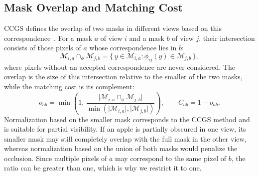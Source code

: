 \documentclass[english, egger, bsc]{vcethesis}
\begin{document}
\subsection{Mask Overlap and Matching Cost}
\label{sec:method_overlap}

CCGS defines the overlap of two masks in different views based on this correspondence~\cite{hu2026ccgs}. For a mask $a$ of view $i$ and a mask $b$ of view $j$, their intersection consists of those pixels of $a$ whose correspondence lies in $b$:
\begin{equation}
    \label{eq:intersection}
    \mathcal{M}_{i,a} \cap_{\phi} \mathcal{M}_{j,b}
    = \{\, y \in \mathcal{M}_{i,a} :
    \phi_{ij}(y) \in \mathcal{M}_{j,b} \,\},
\end{equation}
where pixels without an accepted correspondence are never considered. The overlap is the size of this intersection relative to the smaller of the two masks, while the matching cost is its complement:
\begin{equation}
    \label{eq:overlap_cost}
    o_{ab} = \min\!\left( 1,\,
    \frac{\lvert \mathcal{M}_{i,a} \cap_{\phi}
    \mathcal{M}_{j,b} \rvert}
    {\min(\lvert \mathcal{M}_{i,a} \rvert,
    \lvert \mathcal{M}_{j,b} \rvert)} \right),
    \qquad
    C_{ab} = 1 - o_{ab}.
\end{equation}
Normalization based on the smaller mask corresponds to the CCGS method and is suitable for partial visibility. If an apple is partially obscured in one view, its smaller mask may still completely overlap with the full mask in the other view, whereas normalization based on the union of both masks would penalize the occlusion. Since multiple pixels of $a$ may correspond to the same pixel of $b$, the ratio can be greater than one, which is why we restrict it to one.
\end{document}
